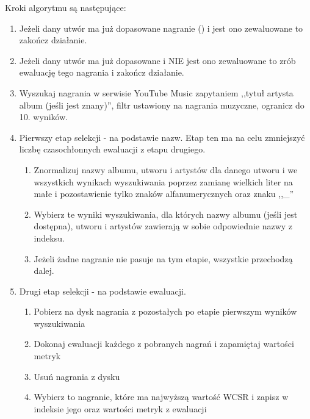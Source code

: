 Kroki algorytmu są następujące:
\begin{enumerate}
    \item Jeżeli dany utwór ma już dopasowane nagranie () i jest ono zewaluowane to
        zakończ działanie.
    \item Jeżeli dany utwór ma już dopasowane  i NIE jest ono zewaluowane to zrób
        ewaluację tego nagrania i zakończ działanie.
    \item Wyszukaj nagrania w serwisie YouTube Music zapytaniem ,,tytuł artysta album (jeśli jest
        znany)'', filtr ustawiony na nagrania muzyczne, ogranicz do 10. wyników.
    \item Pierwszy etap selekcji - na podstawie nazw. Etap ten ma na celu zmniejszyć liczbę
        czasochłonnych ewaluacji z etapu drugiego. 
        \begin{enumerate}
            \item Znormalizuj nazwy albumu, utworu i artystów dla danego utworu i we wszystkich
                wynikach wyszukiwania poprzez zamianę wielkich liter na małe i pozostawienie tylko
                znaków alfanumerycznych oraz znaku ,,\_''
            \item Wybierz te wyniki wyszukiwania, dla których nazwy albumu (jeśli jest
                dostępna), utworu i artystów zawierają w sobie odpowiednie nazwy z indeksu.
            \item Jeżeli żadne nagranie nie pasuje na tym etapie, wszystkie przechodzą dalej.
        \end{enumerate}
    \item Drugi etap selekcji - na podstawie ewaluacji.
        \begin{enumerate}
            \item Pobierz na dysk nagrania z pozostałych po etapie pierwszym wyników wyszukiwania
            \item Dokonaj ewaluacji każdego z pobranych nagrań i zapamiętaj wartości metryk
            \item Usuń nagrania z dysku
            \item Wybierz to nagranie, które ma najwyższą wartość WCSR i zapisz w indeksie jego
                 oraz wartości metryk z ewaluacji
        \end{enumerate}
\end{enumerate}

